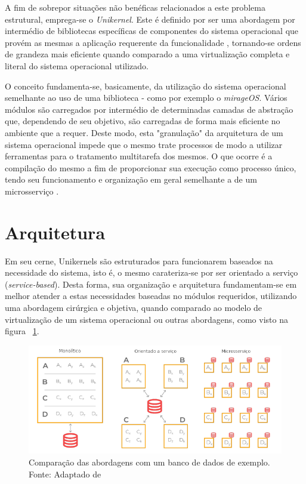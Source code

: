 \documentclass[12pt]{article}
\begin{document}
A fim de sobrepor situações não benéficas relacionados a este problema estrutural, emprega-se o \textit{Unikernel}. Este é definido por ser uma abordagem por intermédio de bibliotecas específicas de componentes do sistema operacional que provém as mesmas a aplicação requerente da funcionalidade \cite{raza:196}, tornando-se ordens de grandeza mais eficiente quando comparado a uma virtualização completa e literal do sistema operacional utilizado.

O conceito fundamenta-se, basicamente, da utilização do sistema operacional semelhante ao uso de uma biblioteca - como por exemplo o \textit{mirageOS}. Vários módulos são carregados por intermédio de determinadas camadas de abstração que, dependendo de seu objetivo, são carregadas de forma mais eficiente no ambiente que a requer. Deste modo, esta "granulação" da arquitetura de um sistema operacional impede que o mesmo trate processos de modo a utilizar ferramentas para o tratamento multitarefa dos mesmos. O que ocorre é a compilação do mesmo a fim de proporcionar sua execução como processo único, tendo seu funcionamento e organização em geral semelhante a de um microsserviço \cite{fraga:120}.

\section{Arquitetura}

Em seu cerne, Unikernels são estruturados para funcionarem baseados na necessidade do sistema, isto é, o mesmo carateriza-se por ser orientado a serviço (\textit{service-based}). Desta forma, sua organização e arquitetura fundamentam-se em melhor atender a estas necessidades baseadas no módulos requeridos, utilizando uma abordagem cirúrgica e objetiva, quando comparado ao modelo de virtualização de um sistema operacional ou outras abordagens, como visto na figura ~\ref{fig:fig1}.

\begin{figure}[H]
\centering
\includegraphics[width=.8\textwidth]{fig1.png}
\caption{Comparação das abordagens com um banco de dados de exemplo. Fonte: Adaptado de \cite{fraga:120}}
\label{fig:fig1}
\end{figure}
\end{document}
